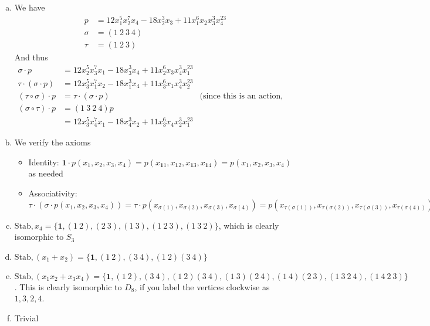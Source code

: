 \documentclass{article}
\newcommand{\set}[1]{ \{ #1 \} }
\newcommand{\id}{ \bm{1} }
\newcommand{\comp}{ \circ }
\newcommand{\Stab}{ \textrm{Stab}, }
\begin{document}
\subsubsection{}\label{ex2p12}
\begin{enumerate}[(a)]
\item
We have 
\begin{align*}
p&=12x_1^5x_2^7x_4 - 18x_2^3x_3 + 11x_1^6x_2x_3^3x_4^{23}\\
\sigma &= (1\ 2\ 3\ 4)\\
\tau &= (1\ 2\ 3)
\end{align*}
And thus
\begin{align*}
\sigma \cdot p &= 12x_2^5x_3^7x_1 - 18x_3^3x_4 + 11x_2^6x_3x_4^3x_1^{23}\\
\tau\cdot(\sigma \cdot p) &= 12x_3^5x_1^7x_2 - 18x_1^3x_4 + 11x_3^6x_1x_4^3x_2^{23}\\
(\tau\comp\sigma)\cdot p &= \tau\cdot(\sigma \cdot p) & \mbox{(since this is an action, by the next part)}\\
(\sigma\comp\tau)\cdot p &= (1\ 3\ 2\ 4)p\\
&= 12x_3^5x_4^7x_1 - 18x_4^3x_2 + 11x_3^6x_4x_2^3x_1^{23}
\end{align*}
\item We verify the axioms \label{ex2p12b} 
\begin{itemize}
\item Identity: $\id\cdot p(x_1,x_2,x_3,x_4) = p(x_{\id{1}},x_{\id{2}},x_{\id{3}},x_{\id{4}}) = p(x_1,x_2,x_3,x_4)$ as needed
\item Associativity: $\tau\cdot(\sigma\cdot p(x_1,x_2,x_3,x_4)) = \tau\cdot p(x_{\sigma(1)},x_{\sigma(2)},x_{\sigma(3)},x_{\sigma(4)}) = p(x_{\tau(\sigma(1))},x_{\tau(\sigma(2))},x_{\tau(\sigma(3))},x_{\tau(\sigma(4))}) = p(x_{\tau\comp\sigma(1)},x_{\tau\comp\sigma(2)},x_{\tau\comp\sigma(3)},x_{\tau\comp\sigma(4)}) = (\tau\comp\sigma)\cdot p(x_1,x_2,x_3,x_4)$
\end{itemize}
\item $\Stab x_4 = \set{\id,(1\ 2),(2\ 3),(1\ 3),(1\ 2\ 3),(1\ 3\ 2)}$, which is clearly isomorphic to $S_3$
\item $\Stab(x_1+x_2) = \set{\id,(1\ 2),(3\ 4),(1\ 2)(3\ 4)}$
\item $\Stab(x_1x_2 + x_3x_4) = \set{\id,(1\ 2),(3\ 4),(1\ 2)(3\ 4),(1\ 3)(2\ 4),(1\ 4)(2\ 3),(1\ 3\ 2\ 4),(1\ 4\ 2\ 3)}$. This is clearly isomorphic to $D_8$, if you label the vertices clockwise as $1, 3, 2, 4$.
\item Trivial
\end{enumerate}
\end{document}
